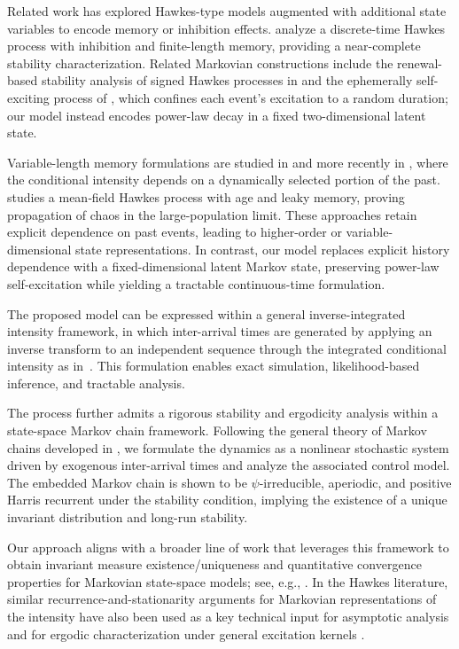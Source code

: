 \documentclass[11pt]{article}
\theoremstyle{definition}
\begin{document}
Related work has explored Hawkes-type models augmented with additional state variables to encode memory or inhibition effects.
\cite{CostaMaillardMuraro2024} analyze a discrete-time Hawkes process with inhibition and finite-length memory, providing a near-complete stability characterization.
Related Markovian constructions include the renewal-based
stability analysis of signed Hawkes processes in
\cite{costa2020renewal} and the ephemerally self-exciting
process of \cite{daw2022ephemerally}, which confines each
event's excitation to a random duration; our model instead
encodes power-law decay in a fixed two-dimensional latent state.

Variable-length memory formulations are studied in \cite{hodara2017hawkes} and more recently in \cite{quayle2025hawkesprocessesvariablelength}, where the conditional intensity depends on a dynamically selected portion of the past.
\cite{Schmutz2022MeanField} studies a mean‑field Hawkes process with age and leaky memory, proving propagation of chaos in the large‑population limit.
These approaches retain explicit dependence on past events, leading to higher-order or variable-dimensional state representations.
In contrast, our model replaces explicit history dependence with a fixed-dimensional latent Markov state, preserving power-law self-excitation while yielding a tractable continuous-time formulation.
 
The proposed model can be expressed within a general inverse-integrated intensity framework, in which inter-arrival times are generated by applying an inverse transform to an independent sequence through the integrated conditional intensity as in~\cite{lee2025self,lee2026forecasting}.
This formulation enables exact simulation, likelihood-based inference, and tractable analysis.

The process further admits a rigorous stability and ergodicity analysis within a state-space Markov chain framework. 
Following the general theory of Markov chains developed in \cite{meyn2009markov}, 
we formulate the dynamics as a nonlinear stochastic system driven by exogenous inter-arrival times and analyze the associated control model.
The embedded Markov chain is shown to be $\psi$-irreducible, aperiodic,
and positive Harris recurrent under the stability condition, 
implying the existence of a unique invariant distribution and long-run stability.

Our approach aligns with a broader line of work that leverages this framework to obtain invariant measure existence/uniqueness and quantitative convergence properties for Markovian state-space models; see, e.g., \citet{MayerhoferStelzerVestweber2020AffineCones,ShaoWangWu2023HybridSwitching}. 
In the Hawkes literature, similar recurrence-and-stationarity arguments for Markovian representations of the intensity have also been used as a key technical input for asymptotic analysis \citep{PalmowskiPojerThonhauser2025RuinHawkes} and for ergodic characterization under general excitation kernels \citep{KwanChenDunsmuir2025ErgodicGeneralKernelHawkes}.
\end{document}
